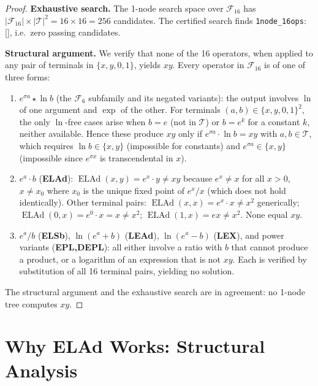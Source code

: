 \documentclass[12pt,a4paper]{article}
\theoremstyle{definition}
\newcommand{\ELAd}{\operatorname{ELAd}}
\begin{document}
\begin{proof}
\noindent\textbf{Exhaustive search.}
The 1-node search space over $\mathcal{F}_{16}$ has
$|\mathcal{F}_{16}|\times|\mathcal{T}|^2 = 16\times 16 = 256$ candidates.
The certified search finds \texttt{1node\_16ops}: [], i.e.\ zero passing
candidates.

\noindent\textbf{Structural argument.}
We verify that none of the 16 operators, when applied to any pair of
terminals in $\{x,y,0,1\}$, yields $xy$.
Every operator in $\mathcal{F}_{16}$ is of one of three forms:
\begin{enumerate}
  \item $e^{\sigma a}\star \ln b$ (the $\mathcal{F}_6$ subfamily and its negated
        variants): the output involves $\ln$ of one argument and $\exp$ of the
        other.  For terminals $(a,b)\in\{x,y,0,1\}^2$, the only $\ln$-free
        cases arise when $b=e$ (not in $\mathcal{T}$) or $b=e^k$ for a constant
        $k$, neither available.  Hence these produce $xy$ only if $e^{\sigma a}
        \cdot\ln b = xy$ with $a,b\in\mathcal{T}$, which requires $\ln b\in
        \{x,y\}$ (impossible for constants) and $e^{\sigma a}\in\{x,y\}$
        (impossible since $e^{\sigma x}$ is transcendental in $x$).

  \item $e^{a}\cdot b$ (\textbf{ELAd}): $\ELAd(x,y)=e^x\cdot y\neq xy$
        because $e^x\neq x$ for all $x>0$, $x\neq x_0$ where $x_0$ is the
        unique fixed point of $e^x/x$ (which does not hold identically).
        Other terminal pairs: $\ELAd(x,x)=e^x\cdot x\neq x^2$ generically;
        $\ELAd(0,x)=e^0\cdot x=x\neq x^2$; $\ELAd(1,x)=ex\neq x^2$.
        None equal $xy$.

  \item $e^{a}/b$ (\textbf{ELSb}), $\ln(e^a+b)$ (\textbf{LEAd}),
        $\ln(e^a-b)$ (\textbf{LEX}), and power variants (\textbf{EPL,DEPL}):
        all either involve a ratio with $b$ that cannot produce a product, or a
        logarithm of an expression that is not $xy$.  Each is verified by
        substitution of all 16 terminal pairs, yielding no solution.
\end{enumerate}
The structural argument and the exhaustive search are in agreement: no
1-node tree computes $xy$.
\end{proof}

\section{Why ELAd Works: Structural Analysis}
\end{document}
